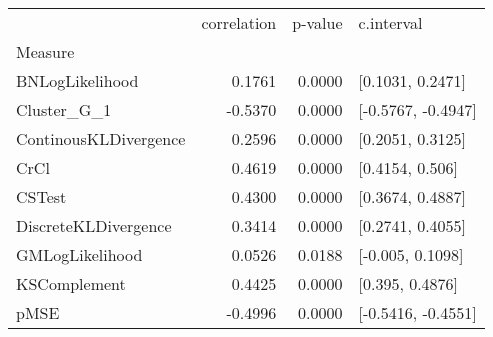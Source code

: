 \begin{tabular}{lrrl}
\toprule
{} &  correlation &  p-value &          c.interval \\
Measure               &              &          &                     \\
\midrule
BNLogLikelihood       &       0.1761 &   0.0000 &    [0.1031, 0.2471] \\
Cluster\_G\_1           &      -0.5370 &   0.0000 &  [-0.5767, -0.4947] \\
ContinousKLDivergence &       0.2596 &   0.0000 &    [0.2051, 0.3125] \\
CrCl                  &       0.4619 &   0.0000 &     [0.4154, 0.506] \\
CSTest                &       0.4300 &   0.0000 &    [0.3674, 0.4887] \\
DiscreteKLDivergence  &       0.3414 &   0.0000 &    [0.2741, 0.4055] \\
GMLogLikelihood       &       0.0526 &   0.0188 &    [-0.005, 0.1098] \\
KSComplement          &       0.4425 &   0.0000 &     [0.395, 0.4876] \\
pMSE                  &      -0.4996 &   0.0000 &  [-0.5416, -0.4551] \\
\bottomrule
\end{tabular}
